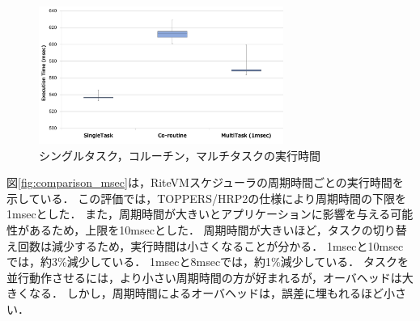 \documentclass[submit,techrep]{ipsj}
\begin{document}


\begin{figure}[t]
    \centering
    \includegraphics[width=8cm,clip]{../EMSOFT2016/figure/comparison_s_c_m.pdf}
    \caption{シングルタスク，コルーチン，マルチタスクの実行時間}
    \label{fig:comparison_s_c_m}
\end{figure}

図\ref{fig:comparison_msec}は，RiteVMスケジューラの周期時間ごとの実行時間を示している．
この評価では，TOPPERS/HRP2の仕様により周期時間の下限を1msecとした．
また，周期時間が大きいとアプリケーションに影響を与える可能性があるため，上限を10msecとした．
周期時間が大きいほど，タスクの切り替え回数は減少するため，実行時間は小さくなることが分かる．
1msecと10msecでは，約3\%減少している．
1msecと8msecでは，約1\%減少している．
タスクを並行動作させるには，より小さい周期時間の方が好まれるが，オーバヘッドは大きくなる．
しかし，周期時間によるオーバヘッドは，誤差に埋もれるほど小さい．
\end{document}
